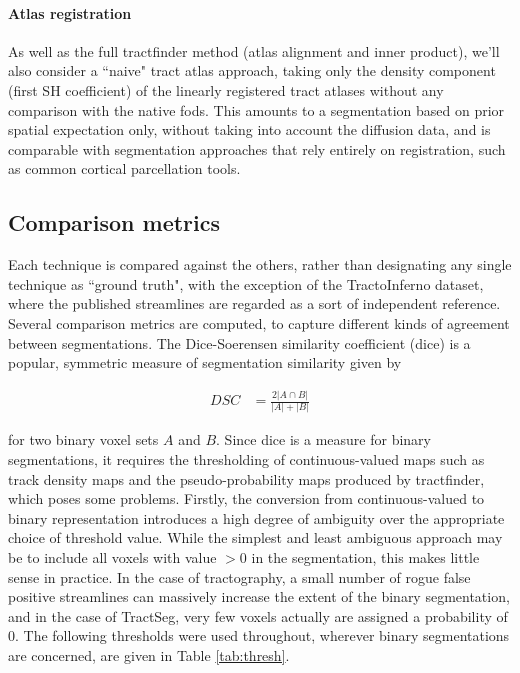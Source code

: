 \paragraph*{Atlas registration}

As well as the full tractfinder method (atlas alignment and inner product), we'll also consider a ``naive" tract atlas approach, taking only the density component (first SH coefficient) of the linearly registered tract atlases without any comparison with the native \glspl{fod}.
This amounts to a segmentation based on prior spatial expectation only, without taking into account the diffusion data, and is comparable with segmentation approaches that rely entirely on registration, such as common cortical parcellation tools.

\subsection{Comparison metrics}

Each technique is compared against the others, rather than designating any single technique as ``ground truth", with the exception of the TractoInferno dataset, where the published streamlines are regarded as a sort of independent reference.
Several comparison metrics are computed, to capture different kinds of agreement between segmentations.
The Dice-Soerensen similarity coefficient (\gls{dice}) \autocite{Dice1945} is a popular, symmetric measure of segmentation similarity given by

\begin{align}
  DSC &= \frac{2 |A \cap B|}{|A| + |B|}
\end{align}

for two binary voxel sets $A$ and $B$.
Since \gls{dice} is a measure for binary segmentations, it requires the thresholding of continuous-valued maps such as track density maps and the pseudo-probability maps produced by tractfinder, which poses some problems.
Firstly, the conversion from continuous-valued to binary representation introduces a high degree of ambiguity over the appropriate choice of threshold value.
While the simplest and least ambiguous approach may be to include all voxels with value $>0$ in the segmentation, this makes little sense in practice.
In the case of tractography, a small number of rogue false positive streamlines can massively increase the extent of the binary segmentation, and in the case of TractSeg, very few voxels actually are assigned a probability of 0.
The following thresholds were used throughout, wherever binary segmentations are concerned, are given in Table \ref{tab:thresh}.


